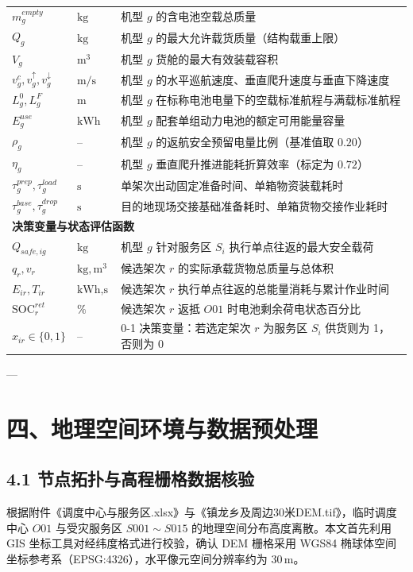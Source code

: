 \documentclass[12pt,a4paper,UTF8]{ctexart}
\begin{document}
\begin{table}[H]
\begin{tabularx}{\textwidth}{p{3.2cm} p{2.2cm} X}
$m_g^{empty}$ & $\text{kg}$ & 机型 $g$ 的含电池空载总质量 \\
$Q_g$ & $\text{kg}$ & 机型 $g$ 的最大允许载货质量（结构载重上限） \\
$V_g$ & $\text{m}^3$ & 机型 $g$ 货舱的最大有效装载容积 \\
$v_g^c, v_g^\uparrow, v_g^\downarrow$ & $\text{m/s}$ & 机型 $g$ 的水平巡航速度、垂直爬升速度与垂直下降速度 \\
$L_g^0, L_g^F$ & $\text{m}$ & 机型 $g$ 在标称电池电量下的空载标准航程与满载标准航程 \\
$E_g^{use}$ & $\text{kWh}$ & 机型 $g$ 配套单组动力电池的额定可用能量容量 \\
$\rho_g$ & -- & 机型 $g$ 的返航安全预留电量比例（基准值取 $0.20$） \\
$\eta_g$ & -- & 机型 $g$ 垂直爬升推进能耗折算效率（标定为 $0.72$） \\
$\tau_g^{prep}, \tau_g^{load}$ & $\text{s}$ & 单架次出动固定准备时间、单箱物资装载耗时 \\
$\tau_g^{base}, \tau_g^{drop}$ & $\text{s}$ & 目的地现场交接基础准备耗时、单箱货物交接作业耗时 \\
\midrule
\multicolumn{3}{l}{\textbf{决策变量与状态评估函数}} \\
$Q_{safe, ig}$ & $\text{kg}$ & 机型 $g$ 针对服务区 $S_i$ 执行单点往返的最大安全载荷 \\
$q_r, v_r$ & $\text{kg}, \text{m}^3$ & 候选架次 $r$ 的实际承载货物总质量与总体积 \\
$E_{ir}, T_{ir}$ & $\text{kWh}, \text{s}$ & 候选架次 $r$ 执行单点往返的总能量消耗与累计作业时间 \\
$\text{SOC}_r^{ret}$ & $\%$ & 候选架次 $r$ 返抵 $O01$ 时电池剩余荷电状态百分比 \\
$x_{ir} \in \{0, 1\}$ & -- & 0-1 决策变量：若选定架次 $r$ 为服务区 $S_i$ 供货则为 1，否则为 0 \\
\bottomrule
\end{tabularx}
\end{table}

---

\section{四、地理空间环境与数据预处理}

\subsection{4.1 节点拓扑与高程栅格数据核验}
根据附件《调度中心与服务区.xlsx》与《镇龙乡及周边30米DEM.tif》，临时调度中心 $O01$ 与受灾服务区 $S001\sim S015$ 的地理空间分布高度离散。本文首先利用 GIS 坐标工具对经纬度格式进行校验，确认 DEM 栅格采用 WGS84 椭球体空间坐标参考系（EPSG:4326），水平像元空间分辨率约为 $30\,\text{m}$。
\end{document}
